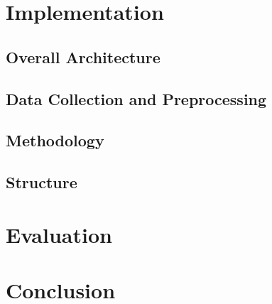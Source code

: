 \documentclass[10pt,a4paper,twocolumn]{article}
\begin{document}
\section{Implementation}
\subsection{Overall Architecture}
\subsection{Data Collection and Preprocessing}

\subsection{Methodology}
\subsection{Structure}
\section{Evaluation}
\section{Conclusion}

\medskip
\newpage
\printbibliography
\end{document}
